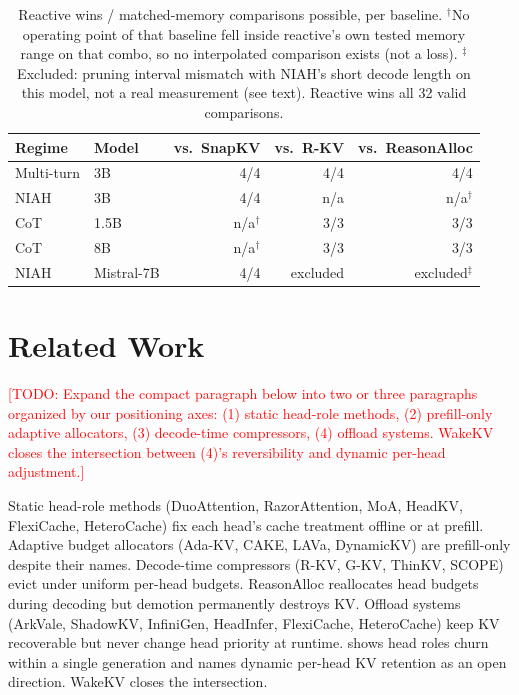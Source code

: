 \documentclass[11pt]{article}
\newcommand{\NEEDPROSE}[1]{\textcolor{red}{[TODO: #1]}}
\begin{document}
\begin{table}[t]
\centering
\small
\begin{tabular}{llrrr}
\toprule
Regime & Model & vs.\ SnapKV & vs.\ R-KV & vs.\ ReasonAlloc \\
\midrule
Multi-turn & 3B & 4/4 & 4/4 & 4/4 \\
NIAH & 3B & 4/4 & n/a\rlap{$^\dagger$} & n/a$^\dagger$ \\
CoT & 1.5B & n/a$^\dagger$ & 3/3 & 3/3 \\
CoT & 8B & n/a$^\dagger$ & 3/3 & 3/3 \\
NIAH & Mistral-7B & 4/4 & excluded\rlap{$^\ddagger$} & excluded$^\ddagger$ \\
\bottomrule
\end{tabular}
\caption{Reactive wins / matched-memory comparisons possible, per
baseline. $^\dagger$No operating point of that baseline fell inside
reactive's own tested memory range on that combo, so no interpolated
comparison exists (not a loss). $^\ddagger$Excluded: pruning interval
mismatch with NIAH's short decode length on this model, not a real
measurement (see text). Reactive wins all 32 valid comparisons.}
\label{tab:baselines}
\end{table}

\section{Related Work}
\label{sec:related}

\NEEDPROSE{Expand the compact paragraph below into two or three
paragraphs organized by our positioning axes: (1) static head-role
methods, (2) prefill-only adaptive allocators, (3) decode-time
compressors, (4) offload systems. WakeKV closes the intersection
between (4)'s reversibility and dynamic per-head adjustment.}

Static head-role methods (DuoAttention, RazorAttention, MoA, HeadKV,
FlexiCache, HeteroCache) fix each head's cache treatment offline or at
prefill. Adaptive budget allocators (Ada-KV, CAKE, LAVa, DynamicKV) are
prefill-only despite their names. Decode-time compressors (R-KV, G-KV,
ThinKV, SCOPE) evict under uniform per-head budgets. ReasonAlloc
reallocates head budgets during decoding but demotion permanently
destroys KV. Offload systems (ArkVale, ShadowKV, InfiniGen, HeadInfer,
FlexiCache, HeteroCache) keep KV recoverable but never change head
priority at runtime. \cite{retrievalheadsdynamic} shows head roles
churn within a single generation and names dynamic per-head KV
retention as an open direction. WakeKV closes the intersection.
\end{document}
